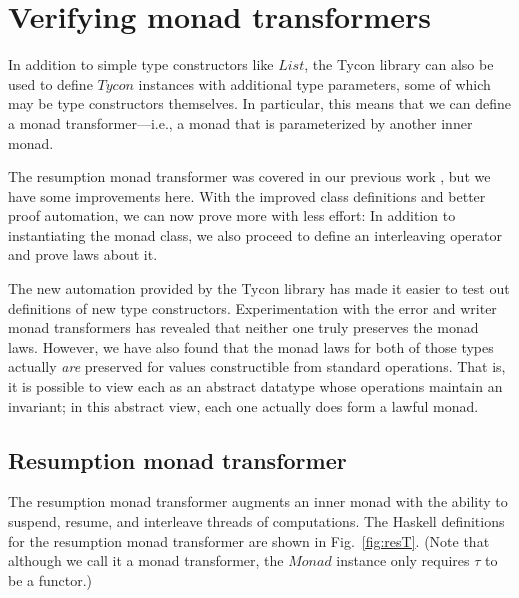 \documentclass{sigplanconf}
\newcommand{\hsc}[1]{\ensuremath{\mathit{#1}}}
\newcommand{\tT}{\tau}
\theoremstyle{definition}
\begin{document}
\section{Verifying monad transformers}
\label{sec:monad-transformers}

In addition to simple type constructors like \hsc{List}, the Tycon library can also be used to define \hsc{Tycon} instances with additional type parameters, some of which may be type constructors themselves. In particular, this means that we can define a monad transformer---i.e., a monad that is parameterized by another inner monad.

The resumption monad transformer was covered in our previous work \cite{HMW2005}, but we have some improvements here. With the improved class definitions and better proof automation, we can now prove more with less effort: In addition to instantiating the monad class, we also proceed to define an interleaving operator and prove laws about it.

The new automation provided by the Tycon library has made it easier to test out definitions of new type constructors. Experimentation with the error and writer monad transformers has revealed that neither one truly preserves the monad laws. However, we have also found that the monad laws for both of those types actually \emph{are} preserved for values constructible from standard operations. That is, it is possible to view each as an abstract datatype whose operations maintain an invariant; in this abstract view, each one actually does form a lawful monad.

\subsection{Resumption monad transformer}
\label{sec:ResT}

The resumption monad transformer \cite{Papaspyrou2001} augments an inner monad with the ability to suspend, resume, and interleave threads of computations. The Haskell definitions for the resumption monad transformer are shown in Fig.~\ref{fig:resT}. (Note that although we call it a monad transformer, the \hsc{Monad} instance only requires $\tT$ to be a functor.)

\newcommand{\apRT}{\mathbin{\circledast}}
\end{document}
